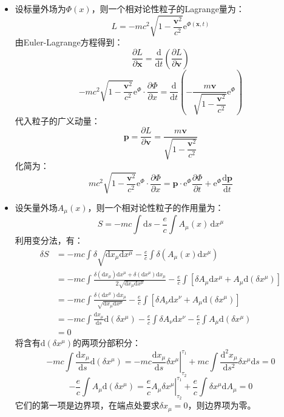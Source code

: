 \documentclass[a4paper,fontset=windows]{ctexart}
\begin{document}
\begin{itemize}
        \item[5.(b)]
        设标量外场为$\varPhi(x)$，则一个相对论性粒子的Lagrange量为：
        \[
        L = -mc^2\sqrt{1 - \frac{\boldsymbol{v}^2}{c^2}}\mathrm{e}^{\varPhi(\boldsymbol{x},t)}
        \]
        由Euler-Lagrange方程得到：
        \[
        \frac{\partial L}{\partial\boldsymbol{x}} = \frac{\mathrm{d}}{\mathrm{d}t}\left(\frac{\partial L}{\partial\boldsymbol{v}}\right)
        \]
        \[
        -mc^2\sqrt{1 - \frac{\boldsymbol{v}^2}{c^2}}\mathrm{e}^\varPhi\cdot\frac{\partial\varPhi}{\partial x} = \frac{\mathrm{d}}{\mathrm{d}t}\left(-\frac{m\boldsymbol{v}}{\sqrt{1 - \dfrac{\boldsymbol{v}^2}{c^2}}}\mathrm{e}^\varPhi\right)
        \]
        代入粒子的广义动量：
        \[
        \boldsymbol{p} = \frac{\partial L}{\partial\boldsymbol{v}} = \frac{m\boldsymbol{v}}{\sqrt{1 - \dfrac{\boldsymbol{v}^2}{c^2}}}
        \]
        化简为：
        \[
        mc^2\sqrt{1 - \frac{\boldsymbol{v}^2}{c^2}}\mathrm{e}^\varPhi\cdot\frac{\partial\varPhi}{\partial x} = \boldsymbol{p}\cdot\mathrm{e}^\varPhi\frac{\partial\varPhi}{\partial t} + \mathrm{e}^\varPhi\frac{\mathrm{d}\boldsymbol{p}}{\mathrm{d}t}
        \]
        \bigskip

        \item[6.]
        设矢量外场$A_\mu(x)$，则一个相对论性粒子的作用量为：
        \[
        S = -mc\int\mathrm{d}s - \frac{e}{c}\int A_\mu(x)\,\mathrm{d}x^\mu
        \]
        利用变分法，有：
        \begin{align*}
        \delta S
        &= -mc\int\delta\sqrt{\mathrm{d}x_\mu\mathrm{d}x^\mu} - \frac{e}{c}\int\delta(A_\mu(x)\mathrm{d}x^\mu) \\
        &= -mc\int\frac{\delta(\mathrm{d}x_\mu)\mathrm{d}x^\mu + \delta(\mathrm{d}x^\mu)\mathrm{d}x_\mu}{2\sqrt{\mathrm{d}x_\mu\mathrm{d}x^\mu}} - \frac{e}{c}\int[\delta A_\mu\mathrm{d}x^\mu + A_\mu\mathrm{d}(\delta x^\mu)] \\
        &= -mc\int\frac{\delta(\mathrm{d}x^\mu)\mathrm{d}x_\mu}{\sqrt{\mathrm{d}x_\mu\mathrm{d}x^\mu}} - \frac{e}{c}\int[\delta A_\nu\mathrm{d}x^\nu + A_\mu\mathrm{d}(\delta x^\mu)] \\
        &= -mc\int\frac{\mathrm{d}x_\mu}{\mathrm{d}s}\mathrm{d}(\delta x^\mu) - \frac{e}{c}\int\delta A_\nu\mathrm{d}x^\nu - \frac{e}{c}\int A_\mu\mathrm{d}(\delta x^\mu) \\
        &= 0
        \end{align*}
        将含有$\mathrm{d}(\delta x^\mu)$的两项分部积分：
        \[
        -mc\int\frac{\mathrm{d}x_\mu}{\mathrm{d}s}\mathrm{d}(\delta x^\mu)
        = \left.-mc\frac{\mathrm{d}x_\mu}{\mathrm{d}s}\delta x^\mu\right|_{\tau_2}^{\tau_1} + mc\int\frac{\mathrm{d}^2 x_\mu}{\mathrm{d}s^2}\delta x^\mu\mathrm{d}s
        = 0
        \]
        \[
        -\frac{e}{c}\int A_\mu\mathrm{d}(\delta x^\mu) = \left.\frac{e}{c}A_\mu\delta x^\mu\right|_{\tau_2}^{\tau_1} + \frac{e}{c}\int \delta x^\mu\mathrm{d}A_\mu = 0
        \]
        它们的第一项是边界项，在端点处要求$\delta x_\mu = 0$，则边界项为零。


\end{itemize}
\end{document}
